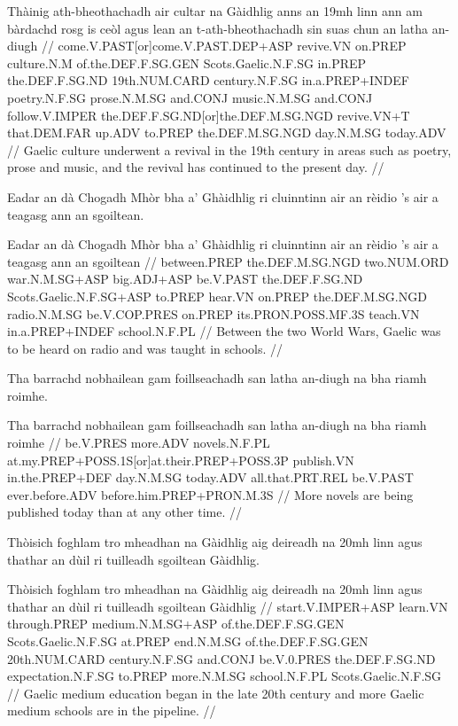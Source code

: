 \documentclass[a4paper,10pt]{article}
\begin{document}
\vspace{4mm}
\gla Thàinig ath-bheothachadh air cultar na Gàidhlig anns an 19mh linn {ann am} bàrdachd rosg is ceòl agus lean an t-ath-bheothachadh sin suas chun an latha an-diugh  //
\glb come.V.PAST[or]come.V.PAST.DEP+ASP revive.VN on.PREP culture.N.M of.the.DEF.F.SG.GEN Scots.Gaelic.N.F.SG in.PREP the.DEF.F.SG.ND 19th.NUM.CARD century.N.F.SG in.a.PREP+INDEF poetry.N.F.SG prose.N.M.SG and.CONJ music.N.M.SG and.CONJ follow.V.IMPER the.DEF.F.SG.ND[or]the.DEF.M.SG.NGD revive.VN+T that.DEM.FAR up.ADV to.PREP the.DEF.M.SG.NGD day.N.M.SG today.ADV  //
\glft Gaelic culture underwent a revival in the 19th century in areas such as poetry, prose and music, and the revival has continued to the present day. //
\endgl
\xe

\ex
\begingl
\glpre Eadar an dà Chogadh Mhòr bha a' Ghàidhlig ri cluinntinn air an rèidio 's air a teagasg ann an sgoiltean. 

\vspace{4mm}
\gla Eadar an dà Chogadh Mhòr bha a' Ghàidhlig ri cluinntinn air an rèidio 's air a teagasg {ann an} sgoiltean  //
\glb between.PREP the.DEF.M.SG.NGD two.NUM.ORD war.N.M.SG+ASP big.ADJ+ASP be.V.PAST the.DEF.F.SG.ND Scots.Gaelic.N.F.SG+ASP to.PREP hear.VN on.PREP the.DEF.M.SG.NGD radio.N.M.SG be.V.COP.PRES on.PREP its.PRON.POSS.MF.3S teach.VN in.a.PREP+INDEF school.N.F.PL  //
\glft Between the two World Wars, Gaelic was to be heard on radio and was taught in schools. //
\endgl
\xe

\ex
\begingl
\glpre Tha barrachd nobhailean gam foillseachadh san latha an-diugh na bha riamh roimhe. 

\vspace{4mm}
\gla Tha barrachd nobhailean gam foillseachadh san latha an-diugh na bha riamh roimhe  //
\glb be.V.PRES more.ADV novels.N.F.PL at.my.PREP+POSS.1S[or]at.their.PREP+POSS.3P publish.VN in.the.PREP+DEF day.N.M.SG today.ADV all.that.PRT.REL be.V.PAST ever.before.ADV before.him.PREP+PRON.M.3S  //
\glft More novels are being published today than at any other time. //
\endgl
\xe

\ex
\begingl
\glpre Thòisich foghlam tro mheadhan na Gàidhlig aig deireadh na 20mh linn agus thathar an dùil ri tuilleadh sgoiltean Gàidhlig. 

\vspace{4mm}
\gla Thòisich foghlam tro mheadhan na Gàidhlig aig deireadh na 20mh linn agus thathar an dùil ri tuilleadh sgoiltean Gàidhlig  //
\glb start.V.IMPER+ASP learn.VN through.PREP medium.N.M.SG+ASP of.the.DEF.F.SG.GEN Scots.Gaelic.N.F.SG at.PREP end.N.M.SG of.the.DEF.F.SG.GEN 20th.NUM.CARD century.N.F.SG and.CONJ be.V.0.PRES the.DEF.F.SG.ND expectation.N.F.SG to.PREP more.N.M.SG school.N.F.PL Scots.Gaelic.N.F.SG  //
\glft Gaelic medium education began in the late 20th century and more Gaelic medium schools are in the pipeline. //
\endgl
\xe
\end{document}
